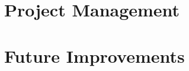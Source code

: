 \documentclass{article}
\begin{document}
    \section*{Project Management}

    \section*{Future Improvements}
\end{document}
